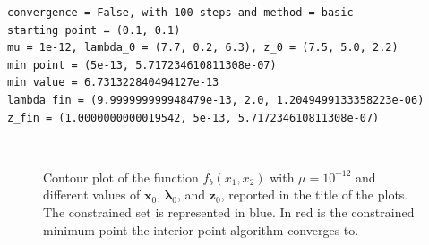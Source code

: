 \documentclass[a4paper,11pt]{article}
\begin{document}
\begin{verbatim}
convergence = False, with 100 steps and method = basic
starting point = (0.1, 0.1)
mu = 1e-12, lambda_0 = (7.7, 0.2, 6.3), z_0 = (7.5, 5.0, 2.2)
min point = (5e-13, 5.717234610811308e-07)
min value = 6.731322840494127e-13
lambda_fin = (9.999999999948479e-13, 2.0, 1.2049499133358223e-06)
z_fin = (1.0000000000019542, 5e-13, 5.717234610811308e-07)
\end{verbatim}




\begin{figure}[H]
	\centering
	 \
	 \\
	\caption{Contour plot of the function $f_{b}(x_{1},x_{2})$ with $\mu=10^{-12}$ and different values of $\textbf{x}_{0}$, $\boldsymbol{\lambda}_{0}$, and $\textbf{z}_{0}$, reported in the title of the plots. The constrained set is represented in blue. In red is the constrained minimum point the interior point algorithm converges to.}
	\label{Fig:func_b_diff_x0_non_conv}
\end{figure}
\end{document}
